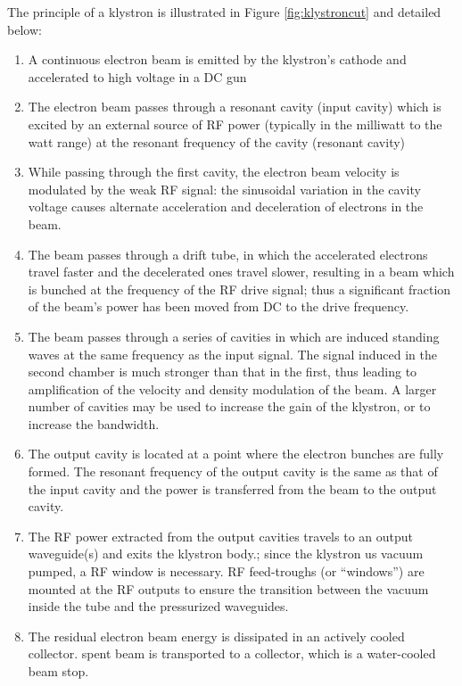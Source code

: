 The principle of a klystron is illustrated in Figure \ref{fig:klystroncut} \parencite{Tenenbaum2003} and detailed below:

\begin{enumerate}
 \item  A continuous electron beam is emitted by the klystron's cathode and accelerated to high voltage in a DC gun 
 \item The electron beam passes through a resonant cavity (input cavity) which is excited by an external source of RF power (typically in the milliwatt to the watt range) at the resonant frequency of the cavity (resonant cavity) 
\item While passing through the first cavity, the electron beam velocity is modulated by the weak RF signal: the sinusoidal variation in the cavity voltage causes alternate acceleration and deceleration of electrons in the beam. 
\item The beam passes through a drift tube, in which the accelerated electrons travel faster and the decelerated ones travel slower, resulting in a beam which is bunched at the frequency of the RF drive signal; thus a significant fraction of the beam’s power has been moved from DC to the drive frequency. 
\item The beam passes through a series of cavities in which are induced standing waves at the same frequency as the input signal. The signal induced in the second chamber is much stronger than that in the first, thus leading to amplification of the velocity and density modulation of the beam. A larger number of cavities may be used to increase the gain of the klystron, or to increase the bandwidth. 
\item The output cavity is located at a point where the electron bunches are fully formed. The resonant frequency of the output cavity is the same as that of the input cavity and the power is transferred from the beam to the output cavity. 
\item The RF power extracted from the output cavities travels to an output waveguide(s) and exits the klystron body.;  since the klystron us vacuum pumped, a RF window is necessary. RF feed-troughs (or “windows”) are mounted at the RF outputs to ensure the transition between the vacuum inside the tube and the pressurized waveguides.
\item The residual electron beam energy is dissipated in an actively cooled collector. spent beam is transported to a collector, which is a water-cooled beam stop. 
\end{enumerate}

